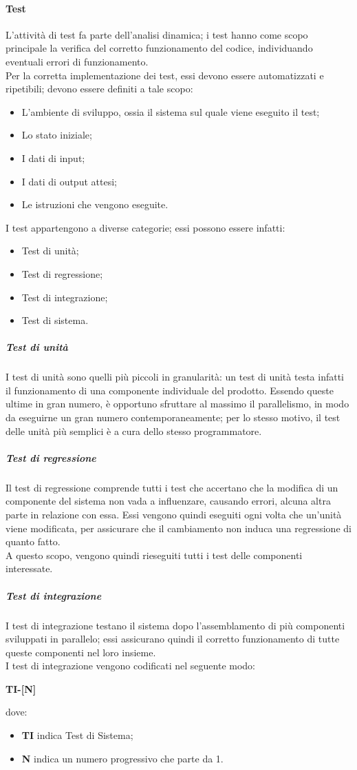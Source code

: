 \documentclass[../norme-di-progetto.tex]{subfiles}
\begin{document}
\paragraph{Test}
L'attività di test fa parte dell'analisi dinamica; i test hanno come scopo principale la verifica del corretto funzionamento del codice, individuando eventuali errori di funzionamento. \\
Per la corretta implementazione dei test, essi devono essere automatizzati e ripetibili; devono essere definiti a tale scopo:
\begin{itemize}
  \item L'ambiente di sviluppo, ossia il sistema sul quale viene eseguito il test;
  \item Lo stato iniziale;
  \item I dati di input;
  \item I dati di output attesi;
  \item Le istruzioni che vengono eseguite.
\end{itemize}
I test appartengono a diverse categorie; essi possono essere infatti:
\begin{itemize}
  \item Test di unità;
  \item Test di regressione;
  \item Test di integrazione;
  \item Test di sistema.
\end{itemize}

\subparagraph*{Test di unità}
I test di unità sono quelli più piccoli in granularità: un test di unità testa infatti il funzionamento di una componente individuale del prodotto. Essendo queste ultime in gran numero, è opportuno sfruttare al massimo il parallelismo, in modo da eseguirne un gran numero contemporaneamente; per lo stesso motivo, il test delle unità più semplici è a cura dello stesso programmatore.

\subparagraph*{Test di regressione}
Il test di regressione comprende tutti i test che accertano che la modifica di un componente del sistema non vada a influenzare, causando errori, alcuna altra parte in relazione con essa. Essi vengono quindi eseguiti ogni volta che un'unità viene modificata, per assicurare che il cambiamento non induca una regressione di quanto fatto. \\
A questo scopo, vengono quindi rieseguiti tutti i test delle componenti interessate.

\subparagraph*{Test di integrazione}
I test di integrazione testano il sistema dopo l'assemblamento di più componenti sviluppati in parallelo; essi assicurano quindi il corretto funzionamento di tutte queste componenti nel loro insieme. \\
I test di integrazione vengono codificati nel seguente modo:
\begin{center}
  \centering
  \textbf{TI-[N]}
\end{center} dove:
\begin{itemize}
  \item \textbf{TI} indica Test di Sistema;
  \item \textbf{N} indica un numero progressivo che parte da 1.
\end{itemize}
\end{document}
